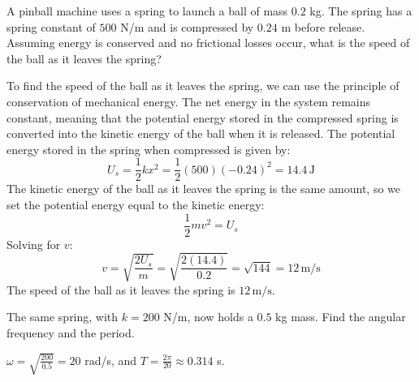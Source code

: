 \begin{Exercise}
	[label={ex:springenergytransfer}, title={Energy Transfer in a Mass-Spring System}]
	A pinball machine uses a spring to launch a ball of mass $0.2$ kg. The spring has
	a spring constant of $500$ N/m and is compressed by $0.24$ m before release.
	Assuming energy is conserved and no frictional losses occur, what is the speed of
	the ball as it leaves the spring?
\end{Exercise}
\begin{Answer}
	[ref={ex:springenergytransfer}] To find the speed of the ball as it leaves the spring,
	we can use the principle of conservation of mechanical energy. The net energy in
	the system remains constant, meaning that the potential energy stored in the
	compressed spring is converted into the kinetic energy of the ball when it is
	released. The potential energy stored in the spring when compressed is given by:
	\[
		U_{s}= \frac{1}{2}k x^{2}= \frac{1}{2}(500) (-0.24)^{2}= 14.4 \, \text{J}
	\]
	The kinetic energy of the ball as it leaves the spring is the same amount, so we
	set the potential energy equal to the kinetic energy:
	\[
		\frac{1}{2}m v^{2}= U_{s}
	\]
	Solving for $v$:
	\[
		v = \sqrt{\frac{2 U_{s}}{m}}= \sqrt{\frac{2 (14.4)}{0.2}}= \sqrt{144}= 12 \, \text{m/s}
	\]
	The speed of the ball as it leaves the spring is $12 \, \text{m/s}$.
\end{Answer}

\begin{Exercise}[title={A Lighter Mass}, label=osc_light]
The same spring, with $k = 200$ N/m, now holds a $0.5$ kg mass. Find the angular frequency and the period.
\end{Exercise}
\begin{Answer}[ref=osc_light]
$\omega = \sqrt{\frac{200}{0.5}} = 20$ rad/s, and $T = \frac{2\pi}{20} \approx 0.314$ s.
\end{Answer}
